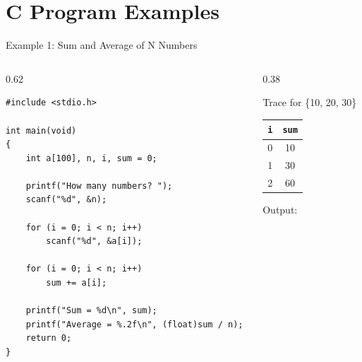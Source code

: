 \documentclass[aspectratio=169]{beamer}
\begin{document}
	\section{C Program Examples}
	\begin{frame}[fragile]{Example 1: Sum and Average of N Numbers}
		\begin{columns}[T]
			\begin{column}{0.62\textwidth}
				\begin{lstlisting}
#include <stdio.h>

int main(void)
{
    int a[100], n, i, sum = 0;

    printf("How many numbers? ");
    scanf("%d", &n);

    for (i = 0; i < n; i++)
        scanf("%d", &a[i]);

    for (i = 0; i < n; i++)
        sum += a[i];

    printf("Sum = %d\n", sum);
    printf("Average = %.2f\n", (float)sum / n);
    return 0;
}
				\end{lstlisting}
			\end{column}
			\begin{column}{0.38\textwidth}
				\begin{block}{Trace for \{10, 20, 30\}}
					\small
					\begin{tabular}{cc}
						\texttt{i} & \texttt{sum} \\ \hline
						0 & 10 \\
						1 & 30 \\
						2 & 60 \\
					\end{tabular}
				\end{block}
				\centering\footnotesize Output:\\ \\[3pt] 
			\end{column}
		\end{columns}
	\end{frame}
\end{document}
